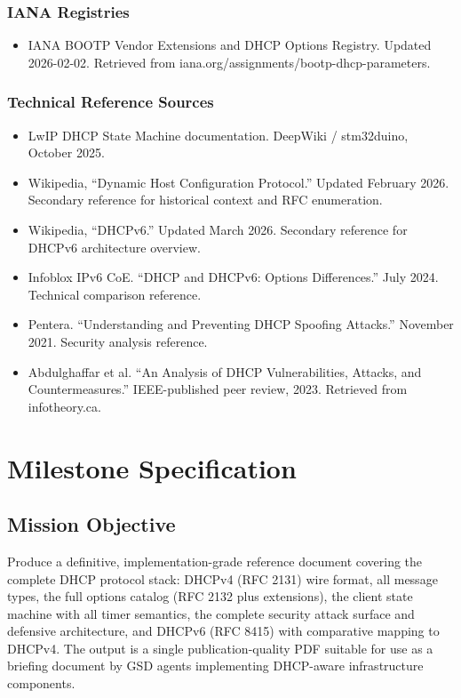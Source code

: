 \documentclass[11pt,letterpaper]{article}
\newcommand{\stageheader}[2]{%
  \noindent\colorbox{#2}{\makebox[\textwidth][l]{%
    \textcolor{white}{\bfseries\sffamily\hspace{6pt}#1\hspace{6pt}}}}%
  \vspace{0.5em}\par%
}
\begin{document}
\subsubsection{IANA Registries}
\begin{itemize}[noitemsep]
  \item IANA BOOTP Vendor Extensions and DHCP Options Registry. Updated 2026-02-02. Retrieved from iana.org/assignments/bootp-dhcp-parameters.
\end{itemize}

\subsubsection{Technical Reference Sources}
\begin{itemize}[noitemsep]
  \item LwIP DHCP State Machine documentation. DeepWiki / stm32duino, October 2025.
  \item Wikipedia, ``Dynamic Host Configuration Protocol.'' Updated February 2026. Secondary reference for historical context and RFC enumeration.
  \item Wikipedia, ``DHCPv6.'' Updated March 2026. Secondary reference for DHCPv6 architecture overview.
  \item Infoblox IPv6 CoE. ``DHCP and DHCPv6: Options Differences.'' July 2024. Technical comparison reference.
  \item Pentera. ``Understanding and Preventing DHCP Spoofing Attacks.'' November 2021. Security analysis reference.
  \item Abdulghaffar et al. ``An Analysis of DHCP Vulnerabilities, Attacks, and Countermeasures.'' IEEE-published peer review, 2023. Retrieved from infotheory.ca.
\end{itemize}

\newpage
\stageheader{STAGE 3 --- MISSION PACKAGE}{tertiary}

\section{Milestone Specification}

\subsection{Mission Objective}

Produce a definitive, implementation-grade reference document covering the complete DHCP protocol stack: DHCPv4 (RFC 2131) wire format, all message types, the full options catalog (RFC 2132 plus extensions), the client state machine with all timer semantics, the complete security attack surface and defensive architecture, and DHCPv6 (RFC 8415) with comparative mapping to DHCPv4. The output is a single publication-quality PDF suitable for use as a briefing document by GSD agents implementing DHCP-aware infrastructure components.
\end{document}
